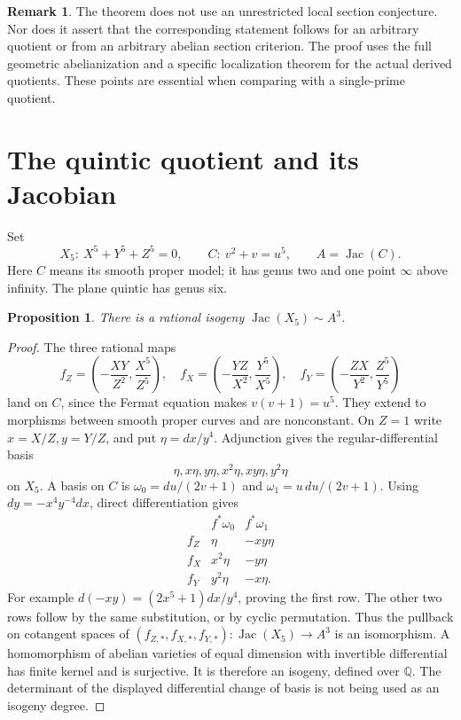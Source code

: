 \documentclass[11pt]{article}
\newcommand{\Q}{\mathbb Q}
\newcommand{\Jac}{\operatorname{Jac}}
\newtheorem{proposition}[theorem]{Proposition}
\theoremstyle{definition}
\newtheorem{remark}[theorem]{Remark}
\begin{document}
\begin{remark}\label{rem:transfer-scope}
The theorem does not use an unrestricted local section conjecture.
Nor does it assert that the corresponding statement follows for an
arbitrary quotient or from an arbitrary abelian section criterion.
The proof uses the full geometric abelianization and a specific
localization theorem for the actual derived quotients. These points
are essential when comparing with a single-prime quotient.
\end{remark}



\section{The quintic quotient and its Jacobian}

Set
\[
X_5:\ X^5+Y^5+Z^5=0,
\qquad C:\ v^2+v=u^5,
\qquad A=\Jac(C).
\]
Here $C$ means its smooth proper model; it has genus two and one point
$\infty$ above infinity. The plane quintic has genus six.

\begin{proposition}\label{prop:isogeny}
There is a rational isogeny $\Jac(X_5)\sim A^3$.
\end{proposition}
\begin{proof}
The three rational maps
\[
f_Z=\left(-\frac{XY}{Z^2},\frac{X^5}{Z^5}\right),\quad
f_X=\left(-\frac{YZ}{X^2},\frac{Y^5}{X^5}\right),\quad
f_Y=\left(-\frac{ZX}{Y^2},\frac{Z^5}{Y^5}\right)
\tag{3.1}\label{eq:maps}
\]
land on $C$, since the Fermat equation makes $v(v+1)=u^5$.
They extend to morphisms between smooth proper curves and are
nonconstant. On $Z=1$ write $x=X/Z,y=Y/Z$, and put
$\eta=dx/y^4$. Adjunction gives the regular-differential basis
\[
\eta, x\eta, y\eta, x^2\eta, xy\eta, y^2\eta
\]
on $X_5$. A basis on $C$ is
$\omega_0=du/(2v+1)$ and $\omega_1=u\,du/(2v+1)$.
Using $dy=-x^4y^{-4}dx$, direct differentiation gives
\[
\begin{array}{c|cc}
 &f^*\omega_0&f^*\omega_1\\\hline
f_Z&\eta&-xy\eta\\
f_X&x^2\eta&-y\eta\\
f_Y&y^2\eta&-x\eta.
\end{array}
\tag{3.2}\label{eq:differentials}
\]
For example $d(-xy)=(2x^5+1)dx/y^4$, proving the first row.
The other two rows follow by the same substitution, or by cyclic
permutation. Thus the pullback on cotangent spaces of
$(f_{Z,*},f_{X,*},f_{Y,*}):\Jac(X_5)\to A^3$ is an isomorphism.
A homomorphism of abelian varieties of equal dimension with invertible
differential has finite kernel and is surjective. It is therefore an
isogeny, defined over $\Q$. The determinant of the displayed
differential change of basis is not being used as an isogeny degree.
\end{proof}
\end{document}
